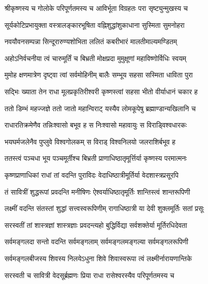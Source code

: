

\twolineshloka
{श्रीकृष्णस्य च गोलोके परिपूर्णतमस्य च}
{आविर्भूता विग्रहतः परा सृष्ट्युन्मुखस्य च}

\twolineshloka
{सूर्यकोटिप्रभायुक्ता वस्त्रालङ्कारभूषिता}
{वह्निशुद्धांशुकाधाना सुस्मिता सुमनोहरा}

\twolineshloka
{नवयौवनसम्पन्ना सिन्दूरारुण्यशोभिता}
{ललितं कबरीभारं मालतीमाल्यमण्डितम्}

\twolineshloka
{अहोऽनिर्वचनीया त्वं चारुमूर्तिं च बिभ्रती}
{मोक्षप्रदा मुमुक्षूणां महाविष्णोर्विधिः स्वयम्}

\twolineshloka
{मुमोह क्षणमात्रेण दृष्ट्वा त्वां सर्वमोहिनीम्}
{बालैः सम्भूय सहसा सस्मिता धाविता पुरा}

\twolineshloka
{सद्भिः ख्याता तेन राधा मूलप्रकृतिरीश्वरी}
{कृष्णस्त्वां सहसा भीतो वीर्याधानं चकार ह}

\twolineshloka
{ततो डिम्भं महज्जज्ञे ततो जातो महान्विराट्}
{यस्यैव लोमकूपेषु ब्रह्माण्डान्यखिलानि च}

\twolineshloka
{राधारतिक्रमेणैव तन्निःश्वासो बभूव ह}
{स निःश्वासो महावायुः स विराड्\mbox{}विश्वधारकः}

\twolineshloka
{भयघर्मजलेनैव पुप्लुवे विश्वगोलकम्}
{स विराड् विश्वनिलयो जलराशिर्बभूव ह}

\twolineshloka
{ततस्त्वं पञ्चधा भूय पञ्चमूर्तीश्च बिभ्रती}
{प्राणाधिष्ठातृमूर्त्तिर्या कृष्णस्य परमात्मनः}

\twolineshloka
{कृष्णप्राणाधिकां राधां तां वदन्ति पुराविदः}
{वेदाधिष्ठात्रीमूर्तिर्या वेदशास्त्रप्रसूरपि}

\twolineshloka
{तं सावित्रीं शुद्धरूपां प्रवदन्ति मनीषिणः}
{ऐश्वर्याधिष्ठातृमूर्तिः शान्तिस्त्वं शान्तरूपिणी}

\twolineshloka
{लक्ष्मीं वदन्ति संतस्तां शुद्धां सत्त्‍‌वस्वरूपिणीम्}
{रागाधिष्ठात्री या देवी शुक्लमूर्तिः सतां प्रसूः}

\twolineshloka
{सरस्वतीं तां शास्त्रज्ञां शास्त्रज्ञाः प्रवदन्त्यहो}
{बुद्धिर्विद्या सर्वशक्तेर्या मूर्तिरधिदेवता}

\twolineshloka
{सर्वमङ्गलदा सन्तो वदन्ति सर्वमङ्गलाम्}
{सर्वमङ्गलमङ्गल्या सर्वमङ्गलरूपिणी}

\twolineshloka
{सर्वमङ्गलबीजस्य शिवस्य निलयेऽधुना}
{शिवे शिवास्वरूपा त्वं लक्ष्मीर्नारायणान्तिके}

\twolineshloka
{सरस्वती च सावित्री वेदसू‌र्ब्रह्मणः प्रिया}
{राधा रासेश्वरस्यैव परिपूर्णतमस्य च}

